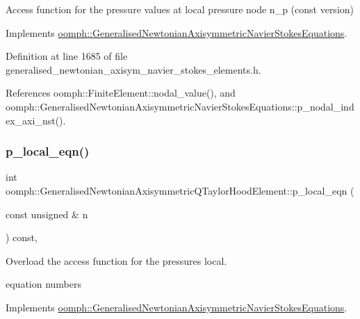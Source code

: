 Access function for the pressure values at local pressure node n\+\_\+p (const version) 



Implements \hyperlink{classoomph_1_1GeneralisedNewtonianAxisymmetricNavierStokesEquations_ac0498239daebac18dd5edc754a8799f9}{oomph\+::\+Generalised\+Newtonian\+Axisymmetric\+Navier\+Stokes\+Equations}.



Definition at line 1685 of file generalised\+\_\+newtonian\+\_\+axisym\+\_\+navier\+\_\+stokes\+\_\+elements.\+h.



References oomph\+::\+Finite\+Element\+::nodal\+\_\+value(), and oomph\+::\+Generalised\+Newtonian\+Axisymmetric\+Navier\+Stokes\+Equations\+::p\+\_\+nodal\+\_\+index\+\_\+axi\+\_\+nst().

\mbox{\label{classoomph_1_1GeneralisedNewtonianAxisymmetricQTaylorHoodElement_a668055f81b262fd80821d1cecce66d0f}} 
\subsubsection{\texorpdfstring{p\+\_\+local\+\_\+eqn()}{p\_local\_eqn()}}
{\footnotesize\ttfamily int oomph\+::\+Generalised\+Newtonian\+Axisymmetric\+Q\+Taylor\+Hood\+Element\+::p\+\_\+local\+\_\+eqn (\begin{DoxyParamCaption}\item[{const unsigned \&}]{n }\end{DoxyParamCaption}) const\hspace{0.3cm}{\ttfamily [inline]}, {\ttfamily [virtual]}}



Overload the access function for the pressure\textquotesingle{}s local. 

equation numbers 

Implements \hyperlink{classoomph_1_1GeneralisedNewtonianAxisymmetricNavierStokesEquations_a1432210bfed0cd920d1fb1c4d9e73d3f}{oomph\+::\+Generalised\+Newtonian\+Axisymmetric\+Navier\+Stokes\+Equations}.




